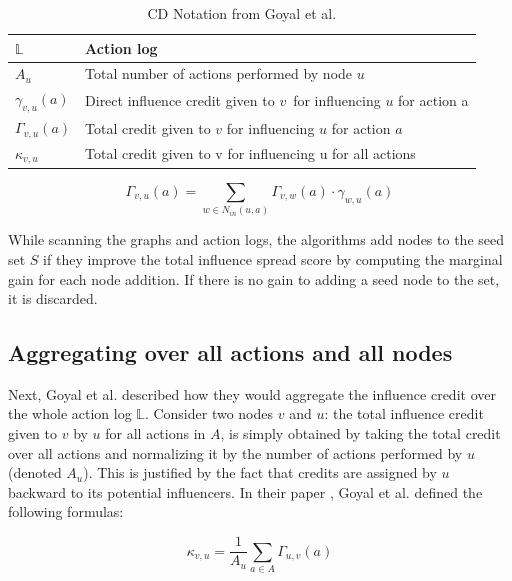 \documentclass{acm_proc_article-sp}
\begin{document}
\begin{table}[h]
	\begin{tabulary}{\linewidth}{|l|L|}
			\hline
			$\mathbb{L}$ & Action log \\\hline
			$A_u$ & Total number of actions performed by node $u$ \\\hline
			$\gamma_{v,u}(a)$ & Direct influence credit given to $v$ for influencing $u$ for action a \\\hline
			$\Gamma_{v,u}(a)$ & Total credit given to $v$ for influencing $u$ for action $a$ \\\hline
			$\kappa_{v,u}$ & Total credit given to v for influencing u for all actions \\\hline
	\end{tabulary}
	\caption{CD Notation from Goyal et al. \cite{goyal:datainfluence}}
	\label{notation2}
\end{table}


\begin{figure}[h]
	\begin{equation}
		\Gamma_{v,u}(a) = \displaystyle\sum_{w \in N_{in}(u,a)} \Gamma_{v,w}(a) \cdot \gamma_{w,u}(a)
	\end{equation}
	\label{CD-formula}
\end{figure}

While scanning the graphs and action logs, the algorithms add nodes to the seed set $S$ if they improve the total influence spread score by computing the marginal gain for each node addition. If there is no gain to adding a seed node to the set, it is discarded.

\subsection{Aggregating over all actions and all nodes}

Next, Goyal et al. described how they would aggregate the influence credit over the whole action log $\mathbb{L}$. Consider two nodes $v$ and $u$: the total influence credit given to $v$ by $u$ for all actions in $A$, is simply obtained by taking the total credit over all actions and normalizing it by the number of actions performed by $u$ (denoted $A_u$). This is justified by the fact that credits are assigned by $u$ backward to its potential influencers. In their paper \cite{goyal:datainfluence}, Goyal et al. defined the following formulas:

\begin{equation}
	\kappa_{v,u} = \frac{1}{A_u} \displaystyle\sum_{a \in A} \Gamma_{u,v}(a)
\end{equation}
\end{document}
